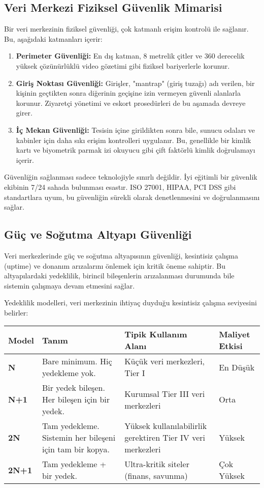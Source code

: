 \subsection{Veri Merkezi Fiziksel Güvenlik Mimarisi}

Bir veri merkezinin fiziksel güvenliği, çok katmanlı erişim kontrolü ile sağlanır. Bu, aşağıdaki katmanları içerir:
\begin{enumerate}
    \item \textbf{Perimeter Güvenliği:} En dış katman, 8 metrelik çitler ve 360 derecelik yüksek çözünürlüklü video gözetimi gibi fiziksel bariyerlerle korunur.
    \item \textbf{Giriş Noktası Güvenliği:} Girişler, "mantrap" (giriş tuzağı) adı verilen, bir kişinin geçtikten sonra diğerinin geçişine izin vermeyen güvenli alanlarla korunur. Ziyaretçi yönetimi ve eskort prosedürleri de bu aşamada devreye girer.
    \item \textbf{İç Mekan Güvenliği:} Tesisin içine girildikten sonra bile, sunucu odaları ve kabinler için daha sıkı erişim kontrolleri uygulanır. Bu, genellikle bir kimlik kartı ve biyometrik parmak izi okuyucu gibi çift faktörlü kimlik doğrulamayı içerir.
\end{enumerate}
Güvenliğin sağlanması sadece teknolojiyle sınırlı değildir. İyi eğitimli bir güvenlik ekibinin 7/24 sahada bulunması esastır. ISO 27001, HIPAA, PCI DSS gibi standartlara uyum, bu güvenliğin sürekli olarak denetlenmesini ve doğrulanmasını sağlar.

\subsection{Güç ve Soğutma Altyapı Güvenliği}

Veri merkezlerinde güç ve soğutma altyapısının güvenliği, kesintisiz çalışma (uptime) ve donanım arızalarını önlemek için kritik öneme sahiptir. Bu altyapılardaki yedeklilik, birincil bileşenlerin arızalanması durumunda bile sistemin çalışmaya devam etmesini sağlar.

Yedeklilik modelleri, veri merkezinin ihtiyaç duyduğu kesintisiz çalışma seviyesini belirler:

\begin{tabularx}{\textwidth}{|l|X|X|X|}
\hline
\textbf{Model} & \textbf{Tanım} & \textbf{Tipik Kullanım Alanı} & \textbf{Maliyet Etkisi} \\
\hline
\textbf{N} & Bare minimum. Hiç yedekleme yok. & Küçük veri merkezleri, Tier I & En Düşük \\
\hline
\textbf{N+1} & Bir yedek bileşen. Her bileşen için bir yedek. & Kurumsal Tier III veri merkezleri & Orta \\
\hline
\textbf{2N} & Tam yedekleme. Sistemin her bileşeni için tam bir kopya. & Yüksek kullanılabilirlik gerektiren Tier IV veri merkezleri & Yüksek \\
\hline
\textbf{2N+1} & Tam yedekleme + bir yedek. & Ultra-kritik siteler (finans, savunma) & Çok Yüksek \\
\hline
\end{tabularx}

